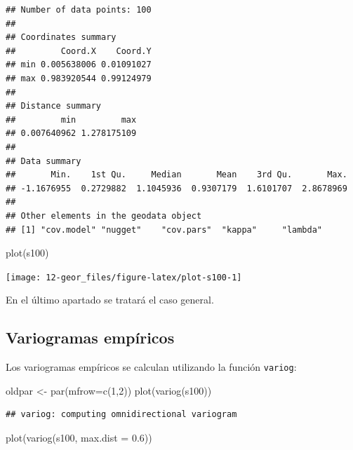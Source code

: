 \documentclass[
  spanish,
]{book}
\newenvironment{Shaded}{\begin{snugshade}}{\end{snugshade}}
\newcommand{\AttributeTok}[1]{\textcolor[rgb]{0.77,0.63,0.00}{#1}}
\newcommand{\DecValTok}[1]{\textcolor[rgb]{0.00,0.00,0.81}{#1}}
\newcommand{\FloatTok}[1]{\textcolor[rgb]{0.00,0.00,0.81}{#1}}
\newcommand{\FunctionTok}[1]{\textcolor[rgb]{0.00,0.00,0.00}{#1}}
\newcommand{\NormalTok}[1]{#1}
\newcommand{\OtherTok}[1]{\textcolor[rgb]{0.56,0.35,0.01}{#1}}
\theoremstyle{break}
\begin{document}
\begin{verbatim}
## Number of data points: 100 
## 
## Coordinates summary
##         Coord.X    Coord.Y
## min 0.005638006 0.01091027
## max 0.983920544 0.99124979
## 
## Distance summary
##         min         max 
## 0.007640962 1.278175109 
## 
## Data summary
##       Min.    1st Qu.     Median       Mean    3rd Qu.       Max. 
## -1.1676955  0.2729882  1.1045936  0.9307179  1.6101707  2.8678969 
## 
## Other elements in the geodata object
## [1] "cov.model" "nugget"    "cov.pars"  "kappa"     "lambda"
\end{verbatim}

\begin{Shaded}
\begin{Highlighting}[]
\FunctionTok{plot}\NormalTok{(s100)}
\end{Highlighting}
\end{Shaded}

\begin{center}\texttt{[image: 12-geor\_files/figure-latex/plot-s100-1]} \end{center}

En el último apartado se tratará el caso general.

\hypertarget{variogramas-empuxedricos}{%
\subsection{Variogramas empíricos}\label{variogramas-empuxedricos}}

Los variogramas empíricos se calculan utilizando la función \texttt{variog}:

\begin{Shaded}
\begin{Highlighting}[]
\NormalTok{oldpar }\OtherTok{\textless{}{-}} \FunctionTok{par}\NormalTok{(}\AttributeTok{mfrow=}\FunctionTok{c}\NormalTok{(}\DecValTok{1}\NormalTok{,}\DecValTok{2}\NormalTok{)) }
\FunctionTok{plot}\NormalTok{(}\FunctionTok{variog}\NormalTok{(s100))}
\end{Highlighting}
\end{Shaded}

\begin{verbatim}
## variog: computing omnidirectional variogram
\end{verbatim}

\begin{Shaded}
\begin{Highlighting}[]
\FunctionTok{plot}\NormalTok{(}\FunctionTok{variog}\NormalTok{(s100, }\AttributeTok{max.dist =} \FloatTok{0.6}\NormalTok{))}
\end{Highlighting}
\end{Shaded}
\end{document}
